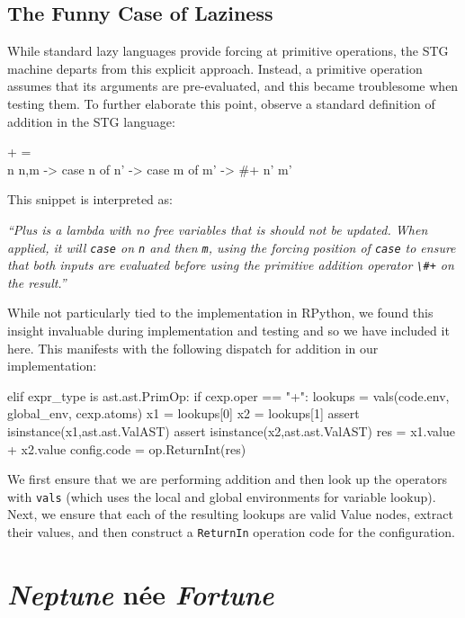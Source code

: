 \documentclass[preprint]{sigplanconf}
\begin{document}
\subsection{The Funny Case of Laziness}

While standard lazy languages provide forcing at primitive operations, the
STG machine departs from this explicit approach. Instead, a primitive operation
assumes that its arguments are pre-evaluated, and this became troublesome when
testing them. To further elaborate this point, observe a standard definition
of addition in the STG language:
\begin{code}[language=Haskell]
+ = \ {} \\n {n,m} -> case n of
                        n' -> case m of
                                m' -> #+ n' m'
\end{code}
This snippet is interpreted as: 
\begin{center}
\emph{
``Plus is a lambda with no free variables that
is should not be updated. When applied, it will \lstinline{case} on
\lstinline{n} and then \lstinline{m}, using the forcing position of
\lstinline{case} to ensure that both inputs are evaluated before using the
primitive addition operator \lstinline{\#+} on the result.''
}
\end{center}
While not particularly tied to the implementation in RPython, we found this
insight invaluable during implementation and testing and so we have included
it here. This manifests with the following dispatch for addition in our
implementation:
\begin{code}
elif expr_type is ast.ast.PrimOp:
  if cexp.oper == "+":
    lookups = vals(code.env,
                   global_env, 
                   cexp.atoms)
    x1      = lookups[0]
    x2      = lookups[1]
    assert isinstance(x1,ast.ast.ValAST)
    assert isinstance(x2,ast.ast.ValAST)
    res     = x1.value + x2.value
    config.code = op.ReturnInt(res) 
\end{code}
We first ensure that we are performing addition and then look up the operators
with \lstinline{vals} (which uses the local and global environments for variable
lookup). Next, we ensure that each of the resulting lookups are valid Value
nodes, extract their values, and then construct a \lstinline{ReturnIn} operation
code for the configuration.

\section{\emph{Neptune} n\'{e}e \emph{Fortune}} %
\end{document}

